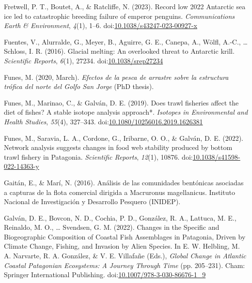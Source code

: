 \documentclass[
]{article}
\newlength{\cslhangindent}
\newlength{\cslentryspacingunit} %
\newenvironment{CSLReferences}[2] %
 {%
  \setlength{\parindent}{0pt}
  \ifodd #1
  \let\oldpar\par
  \def\par{\hangindent=\cslhangindent\oldpar}
  \fi
  \setlength{\parskip}{#2\cslentryspacingunit}
 }%
 {}
\begin{document}
\begin{CSLReferences}{1}{0}
\leavevmode{}%
Fretwell, P. T., Boutet, A., \& Ratcliffe, N. (2023). Record low 2022
{Antarctic} sea ice led to catastrophic breeding failure of emperor
penguins. \emph{Communications Earth \& Environment}, \emph{4}(1), 1--6.
doi:\href{https://doi.org/10.1038/s43247-023-00927-x}{10.1038/s43247-023-00927-x}

\leavevmode{}%
Fuentes, V., Alurralde, G., Meyer, B., Aguirre, G. E., Canepa, A.,
Wölfl, A.-C., \ldots{} Schloss, I. R. (2016). Glacial melting: An
overlooked threat to {Antarctic} krill. \emph{Scientific Reports},
\emph{6}(1), 27234.
doi:\href{https://doi.org/10.1038/srep27234}{10.1038/srep27234}

\leavevmode{}%
Funes, M. (2020, March). \emph{Efectos de la pesca de arrastre sobre la
estructura trófica del norte del {Golfo San Jorge}} (PhD thesis).

\leavevmode{}%
Funes, M., Marinao, C., \& Galván, D. E. (2019). Does trawl fisheries
affect the diet of fishes? {A} stable isotope analysis approach*.
\emph{Isotopes in Environmental and Health Studies}, \emph{55}(4),
327--343.
doi:\href{https://doi.org/10.1080/10256016.2019.1626381}{10.1080/10256016.2019.1626381}

\leavevmode{}%
Funes, M., Saravia, L. A., Cordone, G., Iribarne, O. O., \& Galván, D.
E. (2022). Network analysis suggests changes in food web stability
produced by bottom trawl fishery in {Patagonia}. \emph{Scientific
Reports}, \emph{12}(1), 10876.
doi:\href{https://doi.org/10.1038/s41598-022-14363-y}{10.1038/s41598-022-14363-y}

\leavevmode{}%
Gaitán, E., \& Marí, N. (2016). {Análisis de las comunidades bentónicas
asociadas a capturas de la flota comercial dirigida a Macruronus
magellanicus}. {Instituto Nacional de Investigación y Desarrollo
Pesquero (INIDEP)}.

\leavevmode{}%
Galván, D. E., Bovcon, N. D., Cochia, P. D., González, R. A., Lattuca,
M. E., Reinaldo, M. O., \ldots{} Svendsen, G. M. (2022). Changes in the
{Specific} and {Biogeographic Composition} of {Coastal Fish Assemblages}
in {Patagonia}, {Driven} by {Climate Change}, {Fishing}, and {Invasion}
by {Alien Species}. In E. W. Helbling, M. A. Narvarte, R. A. González,
\& V. E. Villafañe (Eds.), \emph{Global {Change} in {Atlantic Coastal
Patagonian Ecosystems}: {A Journey Through Time}} (pp. 205--231).
{Cham}: {Springer International Publishing}.
doi:\href{https://doi.org/10.1007/978-3-030-86676-1_9}{10.1007/978-3-030-86676-1\_9}


\end{CSLReferences}
\end{document}
